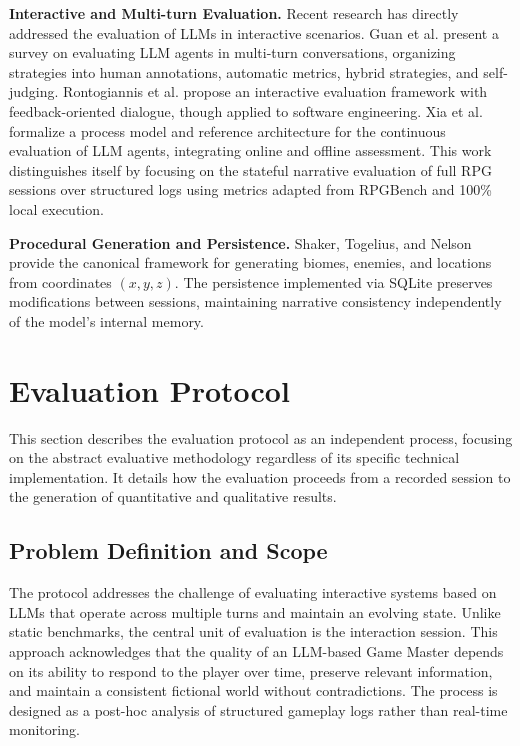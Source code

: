 \documentclass[12pt]{article}
\begin{document}
\textbf{Interactive and Multi-turn Evaluation.}
Recent research has directly addressed the evaluation of LLMs in interactive scenarios. Guan et al. \cite{guan:2025} present a survey on evaluating LLM agents in multi-turn conversations, organizing strategies into human annotations, automatic metrics, hybrid strategies, and self-judging. Rontogiannis et al. \cite{rontogiannis:2025} propose an interactive evaluation framework with feedback-oriented dialogue, though applied to software engineering. Xia et al. \cite{xia:2024} formalize a process model and reference architecture for the continuous evaluation of LLM agents, integrating online and offline assessment. This work distinguishes itself by focusing on the stateful narrative evaluation of full RPG sessions over structured logs using metrics adapted from RPGBench and 100\% local execution.

\textbf{Procedural Generation and Persistence.}
Shaker, Togelius, and Nelson \cite{shaker:2016} provide the canonical framework for generating biomes, enemies, and locations from coordinates $(x,y,z)$. The persistence implemented via SQLite preserves modifications between sessions, maintaining narrative consistency independently of the model's internal memory.

\section{Evaluation Protocol}
\label{sec:protocol}

This section describes the evaluation protocol as an independent process, focusing on the abstract evaluative methodology regardless of its specific technical implementation. It details how the evaluation proceeds from a recorded session to the generation of quantitative and qualitative results.

\subsection{Problem Definition and Scope}

The protocol addresses the challenge of evaluating interactive systems based on LLMs that operate across multiple turns and maintain an evolving state. Unlike static benchmarks, the central unit of evaluation is the interaction session. This approach acknowledges that the quality of an LLM-based Game Master depends on its ability to respond to the player over time, preserve relevant information, and maintain a consistent fictional world without contradictions. The process is designed as a post-hoc analysis of structured gameplay logs rather than real-time monitoring.
\end{document}
